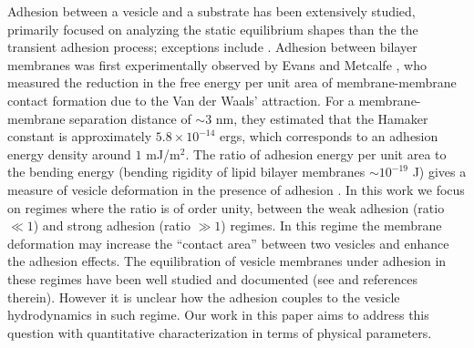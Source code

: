 \documentclass[aps,prl,twocolumn,showpacs,amsmath,amssymb]{revtex4-1}
\begin{document}
%
Adhesion between a vesicle and a substrate has been extensively studied, primarily focused on analyzing the static equilibrium shapes \cite{Seifert1990_PRA, ShiFengGao2006_ActaMechSin, LinFreund2007_IntJSolidsStructures, das2008adhesion, zhang2009phase} than the the transient adhesion process; exceptions include \cite{cantat1999lift, suk-sei2001, BlountMiksisDavis2013_PRSa}.
Adhesion between bilayer membranes was first experimentally observed by Evans and Metcalfe \cite{EvansMetcalfe1984_BJ}, who measured 
the reduction in the free energy per unit area of membrane-membrane contact formation due to the Van der Waals' attraction. For a membrane-membrane
separation distance of $\sim 3$ nm, they estimated that the Hamaker constant is approximately $5.8\times 10^{-14}$ ergs, which corresponds to an adhesion energy density around $1$ mJ/m$^2$. The ratio of adhesion energy per unit area to the bending energy (bending rigidity of lipid bilayer membranes $\sim 10^{-19}$ J) gives a measure of vesicle deformation in the presence of adhesion \cite{RamachandranAndersonLealIsraelachvili2010_Langmuir}. In this work we focus on regimes where the ratio is of order unity, between the weak adhesion (ratio $\ll 1$) and strong adhesion (ratio $\gg 1$) regimes. 
In this regime the membrane deformation may increase the ``contact area'' between two vesicles and enhance the adhesion effects. The equilibration of vesicle membranes under adhesion in these regimes have been well studied and documented (see \cite{RamachandranAndersonLealIsraelachvili2010_Langmuir} and references therein). However it is unclear how the adhesion couples to the vesicle hydrodynamics in such regime.  Our work in this paper aims to address this question with quantitative characterization in terms of physical parameters.
\end{document}
